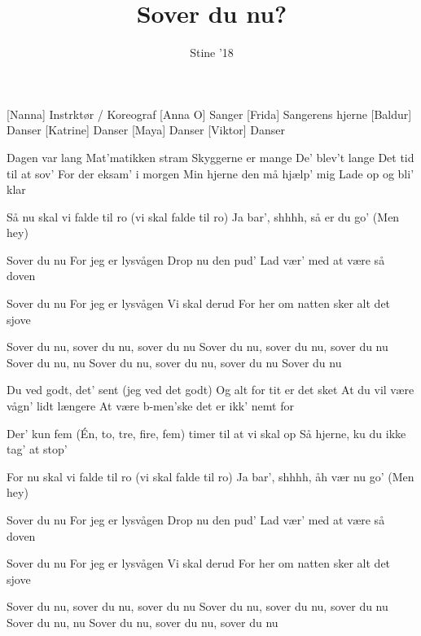\documentclass[a4paper,11pt]{article}
\title{Sover du nu?}
\author{Stine '18}
\begin{document}
\maketitle

\begin{roles}
[Nanna] Instrktør / Koreograf
[Anna O] Sanger
[Frida] Sangerens hjerne
[Baldur] Danser
[Katrine] Danser
[Maya] Danser
[Viktor] Danser
\end{roles}

\begin{song}

%  
Dagen var lang
Mat’matikken stram
Skyggerne er mange
De’ blev’t lange
Det tid til at sov’
For der eksam’ i morgen
Min hjerne den må hjælp’ mig
Lade op og bli’ klar

% 
Så nu skal vi falde til ro (vi skal falde til ro)
Ja bar’, shhhh, så er du go’ (Men hey)

% 
Sover du nu
For jeg er lysvågen
Drop nu den pud’
Lad vær’ med at være så doven 

Sover du nu
For jeg er lysvågen
Vi skal derud
For her om natten sker alt det sjove

% 
Sover du nu, sover du nu, sover du nu
Sover du nu, sover du nu, sover du nu
Sover du nu, nu
Sover du nu, sover du nu, sover du nu
Sover du nu

% 
Du ved godt, det' sent (jeg ved det godt)
Og alt for tit er det sket
At du vil være vågn’ lidt længere
At være b-men’ske det er ikk’ nemt for

Der’ kun fem (Én, to, tre, fire, fem)
timer til at vi skal op
Så hjerne, ku du ikke tag’ at stop’

% 
For nu skal vi falde til ro (vi skal falde til ro)
Ja bar’, shhhh, åh vær nu go’ (Men hey)

%
Sover du nu
For jeg er lysvågen
Drop nu den pud’
Lad vær’ med at være så doven 

Sover du nu
For jeg er lysvågen
Vi skal derud
For her om natten sker alt det sjove

%
Sover du nu, sover du nu, sover du nu
Sover du nu, sover du nu, sover du nu
Sover du nu, nu
Sover du nu, sover du nu, sover du nu


\end{song}
\end{document}

